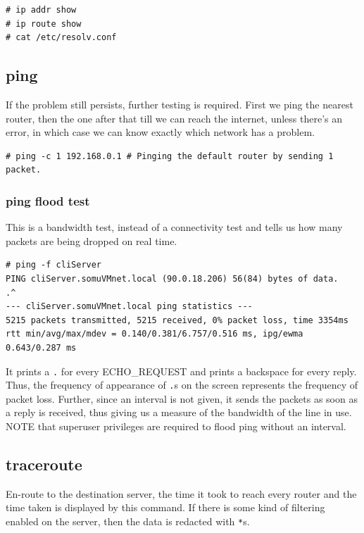 \vspace{-15pt}
\begin{verbatim}
# ip addr show
# ip route show
# cat /etc/resolv.conf
\end{verbatim}
\vspace{-10pt}

\subsection{ping}
If the problem still persists, further testing is required. First we ping the nearest router, then the one after that till we can reach the internet, unless there's an error, in which case we can know exactly which network has a problem. 

\vspace{-15pt}
\begin{verbatim}
# ping -c 1 192.168.0.1 # Pinging the default router by sending 1 packet. 
\end{verbatim}
\vspace{-10pt}

\subsubsection{ping flood test}
This is a bandwidth test, instead of a connectivity test and tells us how many packets are being dropped on real time. 

\vspace{-15pt}
\begin{verbatim}
# ping -f cliServer
PING cliServer.somuVMnet.local (90.0.18.206) 56(84) bytes of data.
.^ 
--- cliServer.somuVMnet.local ping statistics ---
5215 packets transmitted, 5215 received, 0% packet loss, time 3354ms
rtt min/avg/max/mdev = 0.140/0.381/6.757/0.516 ms, ipg/ewma 0.643/0.287 ms
\end{verbatim}
\vspace{-10pt}

\noindent
It prints a \verb|.| for every ECHO\_REQUEST and prints a backspace for every reply. Thus, the frequency of appearance of \verb|.|s on the screen represents the frequency of packet loss. Further, since an interval is not given, it sends the packets as soon as a reply is received, thus giving us a measure of the bandwidth of the line in use. NOTE that superuser privileges are required to flood ping without an interval. 

\subsection{traceroute}
En-route to the destination server, the time it took to reach every router and the time taken is displayed by this command. If there is some kind of filtering enabled on the server, then the data is redacted with \verb|*|s.  

